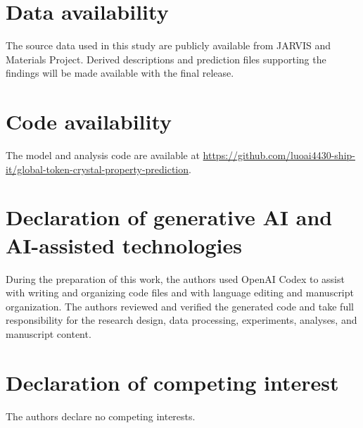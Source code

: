 \documentclass[a4paper,fleqn]{cas-sc}
\begin{document}
\section*{Data availability}
The source data used in this study are publicly available from JARVIS and Materials Project. Derived descriptions and prediction files supporting the findings will be made available with the final release.
\section*{Code availability}
The model and analysis code are available at \url{https://github.com/luoai4430-ship-it/global-token-crystal-property-prediction}.
\section*{Declaration of generative AI and AI-assisted technologies}
During the preparation of this work, the authors used OpenAI Codex to assist with writing and organizing code files and with language editing and manuscript organization. The authors reviewed and verified the generated code and take full responsibility for the research design, data processing, experiments, analyses, and manuscript content.
\section*{Declaration of competing interest}
The authors declare no competing interests.


\end{document}
